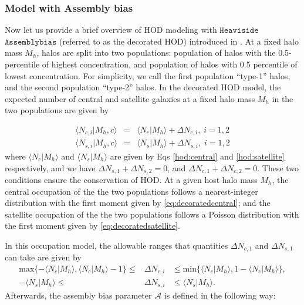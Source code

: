 \documentclass[12pt, preprint]{aastex}
\begin{document}
\subsubsection{Model with Assembly bias}\label{subsubsec:decorated}
Now let us provide a brief overview of HOD modeling with $\mathtt{Heaviside}$ $\mathtt{Assemblybias}$ (referred to as the decorated HOD) introduced in \citet{decorated}. At a fixed halo mass $M_{h}$, halos are split into two populations: population of halos with the 0.5-percentile of highest concentration, and population of halos with 0.5 percentile of lowest concentration. For simplicity, we call the first population ``type-1'' halos, and the second population ``type-2'' halos. In the decorated HOD model, the expected number of central and satellite galaxies at a fixed halo mass $M_{h}$ in the two populations are given by

\begin{eqnarray}
\langle N_{c,i} | M_{h},c\rangle &=& \langle N_{c} | M_{h}\rangle + \Delta N _{c,i}, \; i=1,2 \label{eq:decoratedcentral} \\
\langle N_{s,i} | M_{h},c\rangle &=& \langle N_{s} | M_{h}\rangle + \Delta N _{s,i}, \; i=1,2 \label{eq:decoratedsatellite}
\end{eqnarray}
where $\langle N_{c} | M_{h}\rangle$ and $\langle N_{s} | M_{h}\rangle$ are given by Eqs \ref{hod:central} and \ref{hod:satellite} respectively, and we have $\Delta N_{s,1} + \Delta N_{s,2} = 0$, and $\Delta N_{c,1} + \Delta N_{c,2} = 0$. These two conditions ensure the conservation of HOD. At a given host halo mass $M_{h}$, the central occupation of the the two populations follows a nearest-integer distribution with the first moment given by \ref{eq:decoratedcentral}; and the satellite occupation of the the two populations follows a Poisson distribution with the first moment given by \ref{eq:decoratedsatellite}.

In this occupation model, the allowable ranges that quantities $\Delta N_{c,1}$ and $\Delta N_{s,1}$ can take are given by 
\begin{eqnarray}
\mathrm{max} \{-\langle N_{c} | M_{h}\rangle, \langle N_{c} | M_{h}\rangle -1 \} \leq &\Delta N_{c,i}& \leq \mathrm{min} \{\langle N_{c} | M_{h}\rangle, 1-\langle N_{c} | M_{h}\rangle\}
 , \label{eq:cen-bounds} \\
-\langle N_{s} | M_{h}\rangle \leq & \Delta N_{s,i}& \leq \langle N_{s} | M_{h}\rangle. \label{eq:sat-bounds}
\end{eqnarray}
Afterwards, the assembly bias parameter $\mathcal{A}$ is defined in the following way:
\end{document}
